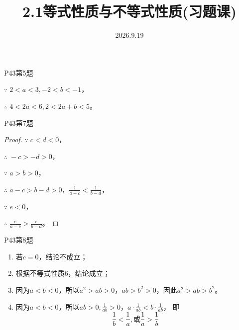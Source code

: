 \documentclass[12pt,aspectratio=169,t,fleqn]{beamer}
\title[2.1等式性质与不等式性质(习题课)] %
{2.1等式性质与不等式性质(习题课)}
\subtitle
{}
\author[好好学习，努力向上] %
{
	}
\institute[夏邑一高] %
{
 }
\date[2026.9.19] %
{2026.9.19}
\begin{document}
\begin{frame}
  \titlepage
\end{frame}




\begin{frame}{P43第5题}

  \begin{solution}
  	$\because\;2<a<3,-2<b<-1$， 
  	
  	$\therefore\;4<2a<6,2<2a+b<5$。
  \end{solution}
  
\end{frame}




\begin{frame}{P43第7题}

  \begin{proof}
  	$\because\;c<d<0$，
  	
  	$\therefore\;-c>-d>0$，
  	
  	$\because\;a>b>0$，
  	
  	$\therefore\;a-c>b-d>0$，$\frac{1}{a-c}<\frac{1}{b-d}$，
  	
  	$\because\;e<0$，
  	
  	$\therefore\;\frac{e}{a-c}>\frac{e}{b-d}$。
  \end{proof}
\end{frame}


\begin{frame}{P43第8题}
\begin{solution}
	\begin{enumerate}[(\Alph*)]
		\item 若$c=0$，结论不成立；
		\item 根据不等式性质6，结论成立；
		\item 因为$a<b<0$，所以$a^2 > ab>0$，$ab>b^2>0$，因此$a^2>ab>b^2$。
		\item 因为$a<b<0$，所以$ab>0,\frac{1}{ab}>0$，$a\cdot\frac{1}{ab}<b\cdot\frac{1}{ab}$，
		即\[
		\frac{1}{b} < \frac{1}{a},\text{或} \frac{1}{a} > \frac{1}{b}
		\]
	\end{enumerate}
\end{solution}
\end{frame}
\end{document}
